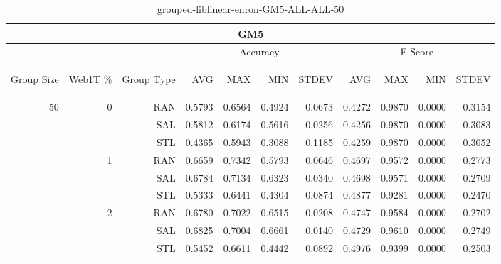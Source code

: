 \begin{center}
\begin{table}[htbp]
\begin{tabular}{ | r | r | r | r | r | r | r | r | r | r | r |}
\hline
\multicolumn{11}{|c|}{GM5}\\
\hline
 & & & \multicolumn{4}{|c|}{Accuracy} & \multicolumn{4}{|c|}{F-Score}\\ \cline{4-11}
\begin{sideways}Group Size\end{sideways} & \begin{sideways}Web1T \%\end{sideways} & \begin{sideways}Group Type\end{sideways} & \begin{sideways}AVG\end{sideways} & \begin{sideways}MAX\end{sideways} & \begin{sideways}MIN\end{sideways} & \begin{sideways}STDEV\end{sideways} & \begin{sideways}AVG\end{sideways} & \begin{sideways}MAX\end{sideways} & \begin{sideways}MIN\end{sideways} & \begin{sideways}STDEV\end{sideways}\\
\hline
\multirow{9}{*}{50}
 & \multirow{3}{*}{0} & RAN & 0.5793 & 0.6564 & 0.4924 & 0.0673 & 0.4272 & 0.9870 & 0.0000 & 0.3154\\ \cline{3-11}
 &   & SAL & 0.5812 & 0.6174 & 0.5616 & 0.0256 & 0.4256 & 0.9870 & 0.0000 & 0.3083\\ \cline{3-11}
 &   & STL & 0.4365 & 0.5943 & 0.3088 & 0.1185 & 0.4259 & 0.9870 & 0.0000 & 0.3052\\ \cline{2-11}
 & \multirow{3}{*}{1} & RAN & 0.6659 & 0.7342 & 0.5793 & 0.0646 & 0.4697 & 0.9572 & 0.0000 & 0.2773\\ \cline{3-11}
 &   & SAL & 0.6784 & 0.7134 & 0.6323 & 0.0340 & 0.4698 & 0.9571 & 0.0000 & 0.2709\\ \cline{3-11}
 &   & STL & 0.5333 & 0.6441 & 0.4304 & 0.0874 & 0.4877 & 0.9281 & 0.0000 & 0.2470\\ \cline{2-11}
 & \multirow{3}{*}{2} & RAN & 0.6780 & 0.7022 & 0.6515 & 0.0208 & 0.4747 & 0.9584 & 0.0000 & 0.2702\\ \cline{3-11}
 &   & SAL & 0.6825 & 0.7004 & 0.6661 & 0.0140 & 0.4729 & 0.9610 & 0.0000 & 0.2749\\ \cline{3-11}
 &   & STL & 0.5452 & 0.6611 & 0.4442 & 0.0892 & 0.4976 & 0.9399 & 0.0000 & 0.2503\\ \cline{2-11}
\hline
\end{tabular}
\caption{grouped-liblinear-enron-GM5-ALL-ALL-50}
\end{table}
\end{center}

